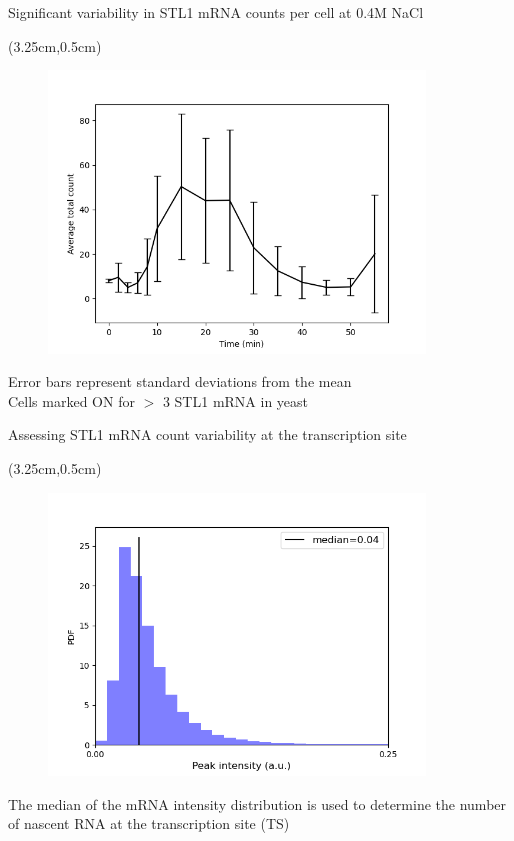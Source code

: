 \documentclass[aspectratio=1610]{beamer}					%
\begin{document}
\begin{frame}{Significant variability in STL1 mRNA counts per cell at 0.4M NaCl}

\begin{textblock*}{5cm}(3.25cm,0.5cm)
\begin{figure}
\includegraphics[width=10cm]{avg-count.png}
\end{figure}
\end{textblock*}

\vspace{7.25cm}
Error bars represent standard deviations from the mean\\
Cells marked ON for $>$ 3 STL1 mRNA in yeast

\end{frame}

\begin{frame}{Assessing STL1 mRNA count variability at the transcription site}

\begin{textblock*}{5cm}(3.25cm,0.5cm)
\begin{figure}
\includegraphics[width=10cm]{int-hist.png}
\end{figure}
\end{textblock*}

\vspace{7.25cm}
The median of the mRNA intensity distribution is used to determine the number of nascent RNA at the transcription site (TS)

\end{frame}
\end{document}
